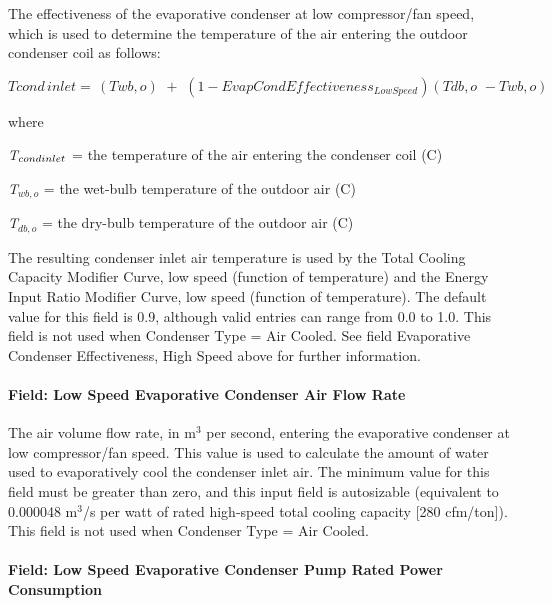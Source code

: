 The effectiveness of the evaporative condenser at low compressor/fan speed, which is used to determine the temperature of the air entering the outdoor condenser coil as follows:

\begin{equation}
Tcond\,inlet = \,\left( {Twb,o} \right)\,\, + \,\,\left( {1 - EvapCondEffectivenes{s_{LowSpeed}}} \right)\left( {Tdb,o\,\, - Twb,o} \right)
\end{equation}

where

\emph{T\(_{cond\\ inlet}\)} = the temperature of the air entering the condenser coil (C)

\emph{T\(_{wb,o}\)} = the wet-bulb temperature of the outdoor air (C)

\emph{T\(_{db,o}\)} = the dry-bulb temperature of the outdoor air (C)

The resulting condenser inlet air temperature is used by the Total Cooling Capacity Modifier Curve, low speed (function of temperature) and the Energy Input Ratio Modifier Curve, low speed (function of temperature). The default value for this field is 0.9, although valid entries can range from 0.0 to 1.0. This field is not used when Condenser Type = Air Cooled. See field Evaporative Condenser Effectiveness, High Speed above for further information.

\paragraph{Field: Low Speed Evaporative Condenser Air Flow Rate}\label{field-low-speed-evaporative-condenser-air-flow-rate}

The air volume flow rate, in m\(^{3}\) per second, entering the evaporative condenser at low compressor/fan speed. This value is used to calculate the amount of water used to evaporatively cool the condenser inlet air. The minimum value for this field must be greater than zero, and this input field is autosizable (equivalent to 0.000048 m\(^{3}\)/s per watt of rated high-speed total cooling capacity {[}280 cfm/ton{]}). This field is not used when Condenser Type = Air Cooled.

\paragraph{Field: Low Speed Evaporative Condenser Pump Rated Power Consumption}\label{field-low-speed-evaporative-condenser-pump-rated-power-consumption}

